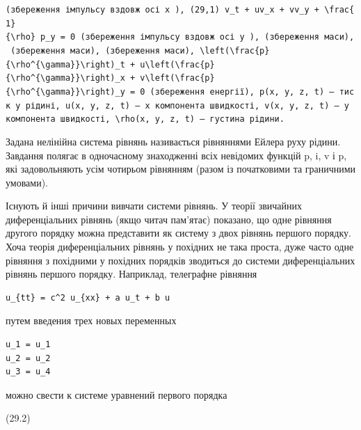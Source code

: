 \documentclass[
  ukrainian,
]{article}
\begin{document}
\texttt{(збереження\ імпульсу\ вздовж\ осі\ \textquotesingle{}x\textquotesingle{}\ ),\ (29,1)\ \textquotesingle{}v\_t\ +\ uv\_x\ +\ vv\_y\ +\ \textbackslash{}frac\{1\}\{\textbackslash{}rho\}\ p\_y\ =\ 0\textquotesingle{}\ (збереження\ імпульсу\ вздовж\ осі\ \textquotesingle{}y\textquotesingle{}\ ),\ (збереження\ маси),\ (збереження\ маси),\ (збереження\ маси),\ \textquotesingle{}\textbackslash{}left(\textbackslash{}frac\{p\}\{\textbackslash{}rho\^{}\{\textbackslash{}gamma\}\}\textbackslash{}right)\_t\ +\ u\textbackslash{}left(\textbackslash{}frac\{p\}\{\textbackslash{}rho\^{}\{\textbackslash{}gamma\}\}\textbackslash{}right)\_x\ +\ v\textbackslash{}left(\textbackslash{}frac\{p\}\{\textbackslash{}rho\^{}\{\textbackslash{}gamma\}\}\textbackslash{}right)\_y\ =\ 0\textquotesingle{}\ (збереження\ енергії),\ \textquotesingle{}p(x,\ y,\ z,\ t)\textquotesingle{}\ —\ тиск\ у\ рідині,\ \textquotesingle{}u(x,\ y,\ z,\ t)\textquotesingle{}\ —\ \textquotesingle{}x\textquotesingle{}\ компонента\ швидкості,\ \textquotesingle{}v(x,\ y,\ z,\ t)\textquotesingle{}\ —\ \textquotesingle{}y\textquotesingle{}\ компонента\ швидкості,\ \textquotesingle{}\textbackslash{}rho(x,\ y,\ z,\ t)\textquotesingle{}\ —\ густина\ рідини.}

Задана нелінійна система рівнянь називається рівняннями Ейлера руху
рідини. Завдання полягає в одночасному знаходженні всіх невідомих
функцій p, i, v і p, які задовольняють усім чотирьом рівнянням (разом із
початковими та граничними умовами).

Існують й інші причини вивчати системи рівнянь. У теорії звичайних
диференціальних рівнянь (якщо читач пам'ятає) показано, що одне рівняння
другого порядку можна представити як систему з двох рівнянь першого
порядку. Хоча теорія диференціальних рівнянь у похідних не така проста,
дуже часто одне рівняння з похідними у похідних порядків зводиться до
системи диференціальних рівнянь першого порядку. Наприклад, телеграфне
рівняння

\begin{verbatim}
u_{tt} = c^2 u_{xx} + a u_t + b u
\end{verbatim}

путем введения трех новых переменных

\begin{verbatim}
u_1 = u_1
u_2 = u_2
u_3 = u_4
\end{verbatim}

можно свести к системе уравнений первого порядка

(29.2)
\end{document}
